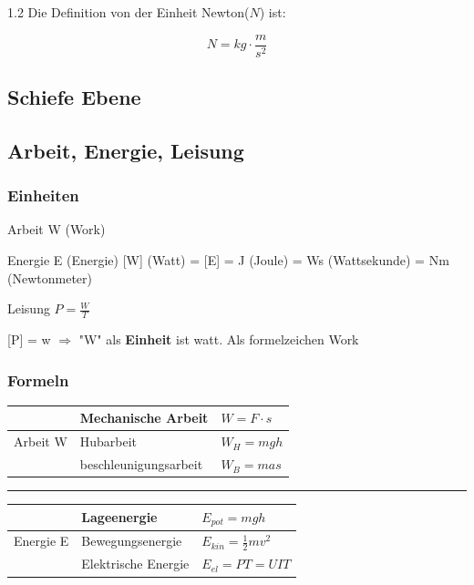 \documentclass{article}
\newcommand{\Zeilenabstand}{1.2}
\newcommand{\absatz}{5mm}
\newcommand{\strich}{\vspace{\absatz}\hrule\vspace{\absatz}}
\begin{document}
\begin{spacing}{\Zeilenabstand}
            Die Definition von der Einheit Newton(\(N\)) ist:

            \begin{equation}
                N=kg\cdot \frac{m}{s^{2}}
            \end{equation}

            \subsection{Schiefe Ebene}




            \newpage
            \subsection{Arbeit, Energie, Leisung}

            \subsubsection{Einheiten}

                Arbeit W (Work)
            
                Energie E (Energie) \hfil [W] (Watt) = [E] = J (Joule) = Ws (Wattsekunde) = Nm (Newtonmeter)
            
                Leisung $P=\frac{W}{T}$  
            
                [P] = w $\Rightarrow$ "W" als \textbf{Einheit} ist watt. Als formelzeichen Work 

            \subsubsection{Formeln}

            \begin{center}
            \begin{tabular}{|l | l| l |}
                \hline
                 & Mechanische Arbeit & $W=F\cdot s$ \\
                \hline
                Arbeit W  & Hubarbeit & $W_H=mgh$ \\
                \hline
                & beschleunigungsarbeit & $W_B=mas$  \\
                \hline
            \end{tabular}

            \strich

            \begin{tabular}{|l| l| l|}
                \hline
                & Lageenergie & $E_{pot}=mgh$ \\
                \hline
                Energie E & Bewegungsenergie & $E_{kin} = \frac{1}{2}mv^2 $\\
                \hline
                & Elektrische Energie & $E_{el}=PT=UIT$\\
                \hline
            \end{tabular}


\end{center}
\end{spacing}
\end{document}
